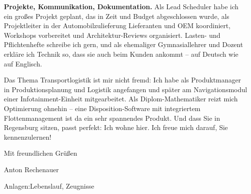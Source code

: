 \documentclass[11pt,a4paper]{article}
\newcommand*{\semibold}{\fontseries{sb}\selectfont}
\newcommand*{\light}{\fontseries{l}\selectfont}
\begin{document}
\textbf{Projekte, Kommunikation, Dokumentation.} Als Lead Scheduler habe ich ein
großes Projekt geplant, das in Zeit und Budget abgeschlossen wurde, als Projektleiter in der
Automobilzulieferung Lieferanten und OEM koordiniert, Workshops vorbereitet und
Architektur-Reviews organisiert. Lasten- und Pflichtenhefte schreibe ich gern, und als
ehemaliger Gymnasiallehrer und Dozent erkläre ich Technik so, dass sie auch beim Kunden
ankommt -- auf Deutsch wie auf Englisch.

Das Thema Transportlogistik ist mir nicht fremd: Ich habe als Produktmanager in
Produktionsplanung und Logistik angefangen und später am Navigationsmodul einer
Infotainment-Einheit mitgearbeitet. Als Diplom-Mathematiker reizt mich Optimierung ohnehin --
eine Disposition-Software mit integriertem Flottenmanagement ist da ein sehr spannendes
Produkt. Und dass Sie in Regensburg sitzen, passt perfekt: Ich wohne hier.%
%
Ich freue mich darauf, Sie kennenzulernen!

Mit freundlichen Grüßen

\vspace{1.0cm}
Anton Rechenauer

\vfill
{\small\color{muted}\semibold Anlagen:\enspace\light Lebenslauf, Zeugnisse}
\end{document}
